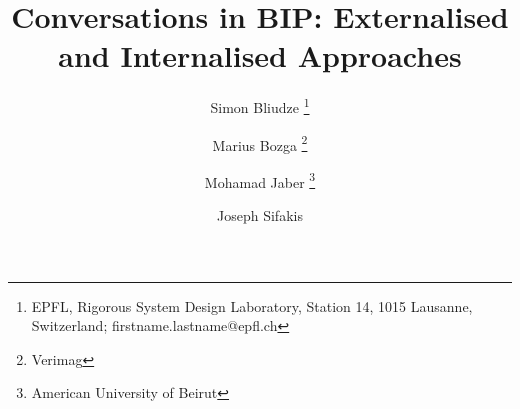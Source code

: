 \documentclass{article}
\title{Conversations in BIP: Externalised and Internalised Approaches}
\author{Simon Bliudze
\thanks{EPFL, Rigorous System Design Laboratory, Station 14, 1015 Lausanne,
Switzerland; firstname.lastname@epfl.ch}
\and Marius Bozga
\thanks{Verimag}
\and Mohamad Jaber
\thanks{American University of Beirut} 
\and Joseph Sifakis
\footnotemark[1]
}
\date{}
\theoremstyle{definition}
\begin{document}
\maketitle

\begin{abstract}
\end{abstract}










\end{document}
